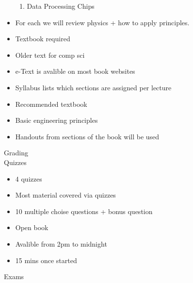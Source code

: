 \documentclass{report}
\begin{document}
\begin{description}
\begin{mdframed}
\begin{itemize}
\begin{enumerate}
                        \item Data Processing Chips
                    \end{enumerate}
                \item For each we will review physics + how to
                    apply principles.
            \end{itemize}
        \end{mdframed}
        \begin{mdframed}
            \begin{itemize}
                \item Textbook required
                \item Older text for comp sci
                \item e-Text is avalible on most book websites
                \item Syllabus lists which sections are assigned
                    per lecture
            \end{itemize}
        \end{mdframed}
        \begin{mdframed}
            \begin{itemize}
                \item Recommended textbook
                \item Basic engineering principles
                \item Handouts from sections of the book will
                    be used
            \end{itemize}
        \end{mdframed}
        \pagebreak
        \begin{mdframed}
            {\huge Grading}\\
            {\large Quizzes}
            \begin{itemize}
                \item 4 quizzes
                \item Most material covered via quizzes
                \item 10 multiple choise questions +
                    bonus question
                \item Open book 
                \item Avalible from 2pm to midnight
                \item 15 mins once started
            \end{itemize}
            {\large Exams}
            \begin{itemize}

\end{itemize}
\end{mdframed}
\end{description}
\end{document}
